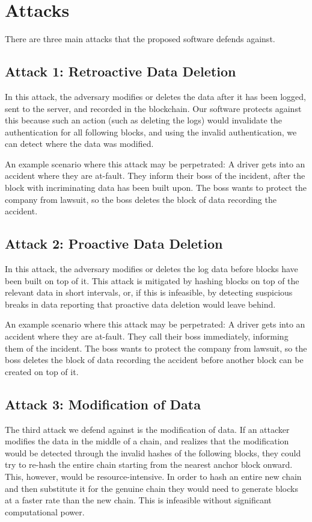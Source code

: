 \chapter{Attacks}
There are three main attacks that the proposed software defends against. 
        \section{Attack 1: Retroactive Data Deletion}
        In this attack, the adversary modifies or deletes the data after it has been logged, sent to the server, and recorded in the blockchain. Our software protects against this because such an action (such as deleting the logs) would invalidate the authentication for all following blocks, and using the invalid authentication, we can detect where the data was modified.
        
        An example scenario where this attack may be perpetrated: \newline A driver gets into an accident where they are at-fault. They inform their boss of the incident, after the block with incriminating data has been built upon. The boss wants to protect the company from lawsuit, so the boss deletes the block of data recording the accident.
        \section{Attack 2: Proactive Data Deletion}
        In this attack, the adversary modifies or deletes the log data before blocks have been built on top of it. This attack is mitigated by hashing blocks on top of the relevant data in short intervals, or, if this is infeasible, by detecting suspicious breaks in data reporting that proactive data deletion would leave behind.
        
        An example scenario where this attack may be perpetrated: \newline A driver gets into an accident where they are at-fault. They call their boss immediately, informing them of the incident. The boss wants to protect the company from lawsuit, so the boss deletes the block of data recording the accident before another block can be created on top of it.
        \section{Attack 3: Modification of Data}
        The third attack we defend against is the modification of data. If an attacker modifies the data in the middle of a chain, and realizes that the modification would be detected through the invalid hashes of the following blocks, they could try to re-hash the entire chain starting from the nearest anchor block onward. This, however, would be resource-intensive. In order to hash an entire new chain and then substitute it for the genuine chain they would need to generate blocks at a faster rate than the new chain. This is infeasible without significant computational power.
        
